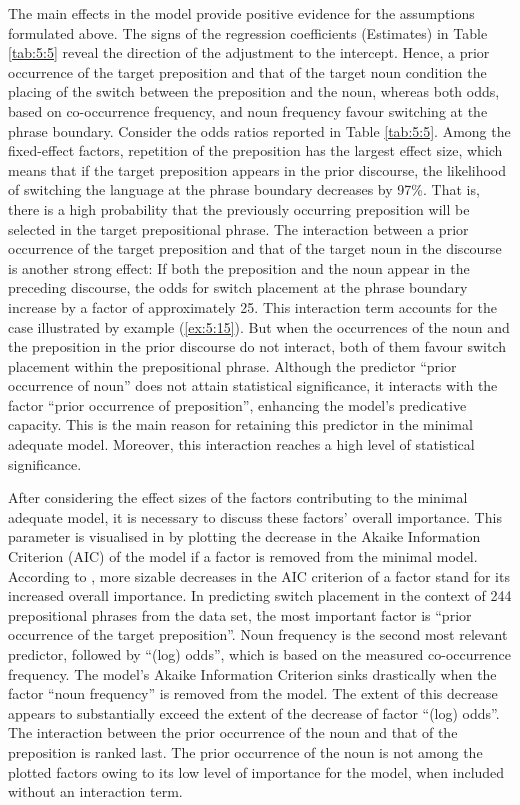 The main effects in the model provide positive evidence for the assumptions formulated above. The signs of the regression coefficients (Estimates) in Table \ref{tab:5:5} reveal the direction of the adjustment to the intercept. Hence, a prior occurrence of the target preposition and that of the target noun condition the placing of the switch between the preposition and the noun, whereas both odds, based on co-occurrence frequency, and noun frequency favour switching at the phrase boundary. Consider the odds ratios reported in Table \ref{tab:5:5}. Among the fixed-effect factors, repetition of the preposition has the largest effect size, which means that if the target preposition appears in the prior discourse, the likelihood of switching the language at the phrase boundary decreases by 97\%. That is, there is a high probability that the previously occurring preposition will be selected in the target prepositional phrase. The interaction between a prior occurrence of the target preposition and that of the target noun in the discourse is another strong effect: If both the preposition and the noun appear in the preceding discourse, the odds for switch placement at the phrase boundary increase by a factor of approximately 25. This interaction term accounts for the case illustrated by example (\ref{ex:5:15}). But when the occurrences of the noun and the preposition in the prior discourse do not interact, both of them favour switch placement within the prepositional phrase. Although the predictor “prior occurrence of noun” does not attain statistical significance, it interacts with the factor “prior occurrence of preposition”, enhancing the model's predicative capacity. This is the main reason for retaining this predictor in the minimal adequate model. Moreover, this interaction reaches a high level of statistical significance.

After considering the effect sizes of the factors contributing to the minimal adequate model, it is necessary to discuss these factors’ overall importance. This parameter is visualised in  by plotting the decrease in the Akaike Information Criterion (AIC) of the model if a factor is removed from the minimal model. According to \citet{szmrecsanyi-2013}, more sizable decreases in the AIC criterion of a factor stand for its increased overall importance. In predicting switch placement in the context of 244 prepositional phrases from the data set, the most important factor is “prior occurrence of the target preposition”. Noun frequency is the second most relevant predictor, followed by “(log) odds”, which is based on the measured co-occurrence frequency. The model's Akaike Information Criterion sinks drastically when the factor “noun frequency” is removed from the model. The extent of this decrease appears to substantially exceed the extent of the decrease of factor “(log) odds”. The interaction between the prior occurrence of the noun and that of the preposition is ranked last. The prior occurrence of the noun is not among the plotted factors owing to its low level of importance for the model, when included without an interaction term.

